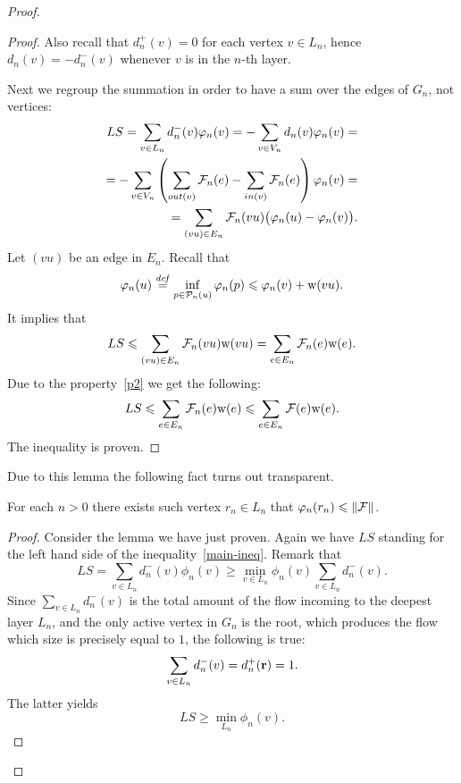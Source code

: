 \documentclass[12pt]{amsart}
\begin{document}
\begin{proof}
\begin{proof}
        Also recall that $d_n^{+}(v) = 0$ for each vertex $v \in L_n$, hence $d_n(v) = -d_n^{-}(v)$ whenever $v$ is in the $n$-th layer.

        Next we regroup the summation in order to have a sum over the edges of $G_n$, not vertices:
        \begin{align*}
          LS = \sum\limits_{v \in L_n} d_n^{-}(v) \varphi_n(v) = -\sum\limits_{v \in V_n} d_n(v) \varphi_n(v) =\\
          =-\sum_{v \in V_n} \left(\sum_{out(v)} \mathcal{F}_{n}(e) - \sum_{in(v)}\mathcal{F}_{n}(e) \right) \varphi_n(v)=\\
          =\sum_{(vu) \in E_n} \mathcal{F}_{n}(vu) \big(\varphi_n(u) - \varphi_n(v)\big).
        \end{align*}
        Let $(vu)$ be an edge in $E_n$. Recall that
        \[
          \varphi_n(u) \overset{\mathit{def}}{=} \inf_{p \in \mathcal{P}_n(u)} \varphi_n(p) \leqslant \varphi_n(v) + \mathrm{w}(vu).
        \]
        It implies that
        \[
          LS\leqslant \sum_{(vu) \in E_n} \mathcal{F}_{n}(vu) \mathrm{w}(vu) = \sum_{e \in E_n} \mathcal{F}_{n}(e) \mathrm{w}(e).
        \]
        Due to the property~\ref{p2} we get the following:
        \[
          LS\leqslant \sum_{e \in E_n} \mathcal{F}_{n}(e) \mathrm{w}(e) \leqslant \sum_{e \in E_n} \mathcal{F}(e) \mathrm{w}(e).
        \]
        The inequality is proven.
      \end{proof}
      Due to this lemma the following fact turns out transparent.
      \begin{prop}
        For each $n > 0$ there exists such vertex $r_n \in L_n$ that $\varphi_n(r_n) \leqslant \|\mathcal{F}\|$.
      \end{prop}
      \begin{proof}
        Consider the lemma we have just proven.
        Again we have $LS$ standing for the left hand side of the inequality~\eqref{main-ineq}.
        Remark that
        \[
          LS = \sum_{v \in L_n}d^{-}_n(v) \phi_n(v) \geq \min_{v \in L_n}\phi_n(v) \sum_{v \in L_n} d^{-}_n(v).
        \]
        Since $\sum\limits_{v \in L_n} d^{-}_n(v)$ is the total amount of the flow incoming to the deepest layer $L_n$, and the only
          active vertex in $G_n$ is the root, which produces the flow which size is precisely equal to $1$, the following is true:
        \[
          \sum_{v \in L_n} d^{-}_n(v) = d^{+}_n(\mathbf{r}) = 1.
        \]
        The latter yields
        \[
          LS \geq \min_{L_n} \phi_n(v).
        \]


\end{proof}
\end{proof}
\end{document}
